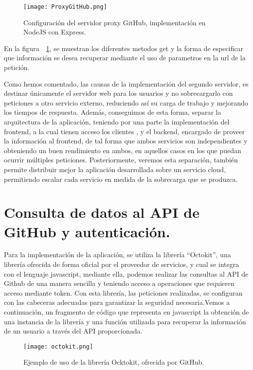 \begin{figure}[h!]
  \centerline{\texttt{[image: ProxyGitHub.png]}}
  \caption{Configuración del servidor proxy GitHub, implementación en NodeJS con Express.}
  \label{figure:ProxyGitHub}
\end{figure}
En la figura~~\ref{figure:ProxyGitHub}, se muestran los diferentes metodos get y la forma de especificar que información se desea recuperar mediante el uso de parametros en la url de la petición.


Como hemos comentado, las causas de la implementación del segundo servidor, es destinar únicamente el servidor web para los usuarios y no sobrecargarlo con peticiones a otro servicio externo, reduciendo así su carga de trabajo y mejorando los tiempos de respuesta. Además, conseguimos de esta forma, separar la arquitectura de la aplicación, teniendo por una parte la implementación del frontend, a la cual tienen acceso los clientes , y el backend, encargado de proveer la información al frontend, de tal forma que ambos servicios son independientes y obteniendo un buen rendimiento en ambos, en aquellos casos en los que puedan ocurrir múltiples peticiones. Posteriormente, veremos esta separación, también permite distribuir mejor la aplicación desarrollada sobre un servicio cloud, permitiendo escalar cada servicio en medida de la sobrecarga que se produzca.



\section{Consulta de datos al API de GitHub y autenticación.}

Para la implementación de la aplicación, se utiliza la librería “Octokit”, una librería ofrecida de forma oficial por el proveedor de servicios, y cual se integra con el lenguaje javascript, mediante ella, podemos realizar las consultas al API de Github de una manera sencilla y teniendo acceso a operaciones que requieren acceso mediante token. Con esta librería, las peticiones realizadas, se configuran con las cabeceras adecuadas para garantizar la seguridad necesaria.Vemos a continuación, un fragmento de código que representa en javascript la obtención de una instancia de la librería y una función utilizada para recuperar la información de un usuario a través del API proporcionada.

\begin{figure}[h!]
  \centerline{\texttt{[image: octokit.png]}}
  \caption{Ejemplo de uso de la librería Ocktokit, ofrecida por GitHub.}
  \label{figure:octokit}
\end{figure}

